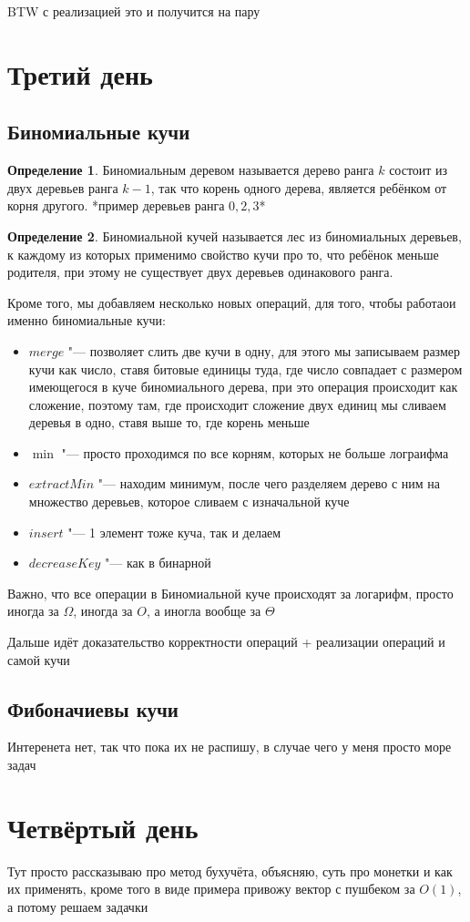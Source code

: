 \documentclass[a4paper, 12pt]{article}
\theoremstyle{plain}
\theoremstyle{definition}
\newtheorem{definition}{Определение}[section]
\theoremstyle{remark}
\newcommand{\aritem}{\item[$\hookrightarrow$]}
\begin{document}
BTW  с реализацией это и получится на пару
\section{Третий день}
\subsection{Биномиальные кучи}
\begin{definition}
	Биномиальным деревом называется дерево ранга $k$ состоит из двух деревьев ранга $k-1$, так что корень одного дерева, является ребёнком от корня другого. *пример деревьев ранга $0, 2, 3$*
\end{definition}
\begin{definition}
	Биномиальной кучей называется лес из биномиальных деревьев, к каждому из которых применимо свойство кучи про то, что ребёнок меньше родителя, при этому не существует двух деревьев одинакового ранга.
	
	Кроме того, мы добавляем несколько новых операций, для того, чтобы работаои именно биномиальные кучи:
	\begin{itemize}
		\aritem$merge$ "--- позволяет слить две кучи в одну, для этого мы записываем размер кучи как число, ставя битовые единицы туда, где число совпадает с размером имеющегося в куче биномиального дерева, при это операция происходит как сложение, поэтому там, где происходит сложение двух единиц мы сливаем деревья в одно, ставя выше то, где корень меньше
		\aritem $\min$ "--- просто проходимся по все корням, которых не больше лограифма
		\aritem $extractMin$ "--- находим минимум, после чего разделяем дерево с ним на множество деревьев, которое сливаем с изначальной куче
		\aritem $insert$ "--- 1 элемент тоже куча, так и делаем
		\aritem $decreaseKey$ "--- как в бинарной
	\end{itemize}
\end{definition}
Важно, что все операции в Биномиальной куче происходят за логарифм, просто иногда за $\Omega$, иногда за $O$, а иногла вообще за $\Theta$

Дальше идёт доказательство корректности операций + реализации операций и самой кучи
\subsection{Фибоначиевы кучи}
Интеренета нет, так что пока их не распишу, в случае чего у меня просто море задач
\section{Четвёртый день}
Тут просто рассказываю про метод бухучёта, объясняю, суть про монетки и как их применять, кроме того в виде примера привожу вектор с пушбеком за $O(1)$, а потому решаем задачки
\end{document}
